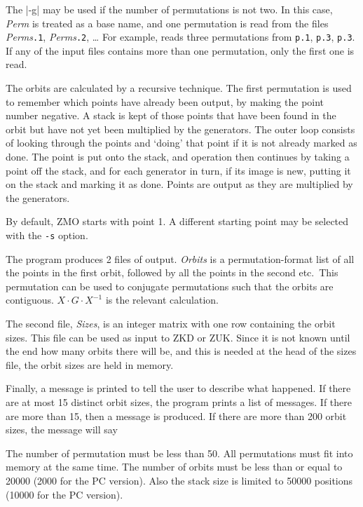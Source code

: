 The |-g| may be used if the number of permutations is not
two. In this case, {\it Perm} is treated as a base name, and one
permutation is read from the files {\it Perms}{\tt.1},
{\it Perms}{\tt.2}, \ldots{} For example,
reads three permutations from {\tt p.1}, {\tt p.3}, {\tt p.3}.
If any of the input files contains more than one permutation,
only the first one is read.

\Implementation
The orbits are calculated by a recursive
technique. The first permutation is used to remember which points have
already been output, by making the point number negative. A stack is
kept of those points that have been found in the orbit but have not
yet been multiplied by the generators. The outer loop consists of
looking through the points and `doing' that point if it is not already
marked as done. The point is put onto the stack, and operation then
continues by taking a point off the stack, and for each generator in
turn, if its image is new, putting it on the stack and marking it as
done. Points are output as they are multiplied by the generators.

By default, ZMO starts with point 1. A different starting point may
be selected with the \verb"-s" option.

The program produces 2 files of output. {\it Orbits} is a
permutation-format list of all the points in the first orbit, followed
by all the points in the second etc.\ This permutation can be used to
conjugate permutations such that the orbits are contiguous.
$X\cdot G\cdot X^{-1}$ is the relevant calculation.

The second file, {\it Sizes}, is an integer matrix with one row
containing the orbit sizes. This file can be used as input to ZKD
or ZUK.  Since it is not known until the end how many
orbits there will be, and this is needed at the head of the sizes
file, the orbit sizes are held in memory.

Finally, a message is printed to tell the user to describe what
happened. If there are at most 15 distinct orbit sizes, the program
prints a list of
messages. If there are more than 15, then a message
is produced. If there are more than 200 orbit sizes, the message will
say


\Limits
The number of permutation must be less than 50. 
All permutations must fit into memory at the same time. The number
of orbits must be less than or equal to 20000 (2000 for the PC
version). Also the stack size is limited to 50000 positions (10000
for the PC version).



